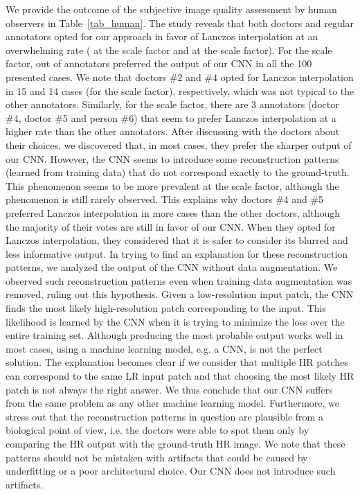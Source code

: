 \documentclass{ieeeaccess}
\begin{document}
We provide the outcome of the subjective image quality assessment by human observers in Table~\ref{tab_human}. The study reveals that both doctors and regular annotators opted for our approach in favor of Lanczos interpolation at an overwhelming rate ( at the  scale factor and  at the  scale factor). For the  scale factor,  out of  annotators preferred the output of our CNN in all the 100 presented cases. We note that doctors \#2 and \#4 opted for Lanczos interpolation in 15 and 14 cases (for the  scale factor), respectively, which was not typical to the other annotators. Similarly, for the  scale factor, there are 3 annotators (doctor \#4, doctor \#5 and person \#6) that seem to prefer Lanczos interpolation at a higher rate than the other annotators. After discussing with the doctors about their choices, we discovered that, in most cases, they prefer the sharper output of our CNN. However, the CNN seems to introduce some reconstruction patterns (learned from training data) that do not correspond exactly to the ground-truth. This phenomenon seems to be more prevalent at the  scale factor, although the phenomenon is still rarely observed. This explains why doctors \#4 and \#5 preferred Lanczos interpolation in more cases than the other doctors, although the majority of their votes are still in favor of our CNN. When they opted for Lanczos interpolation, they considered that it is safer to consider its blurred and less informative output. In trying to find an explanation for these reconstruction patterns, we analyzed the output of the CNN without data augmentation. We observed such reconstruction patterns even when training data augmentation was removed, ruling out this hypothesis. Given a low-resolution input patch, the CNN finds the most likely high-resolution patch corresponding to the input. This likelihood is learned by the CNN when it is trying to minimize the loss over the entire training set. Although producing the most probable output works well in most cases, using a machine learning model, e.g. a CNN, is not the perfect solution. The explanation becomes clear if we consider that multiple HR patches can correspond to the same LR input patch and that choosing the most likely HR patch is not always the right answer. We thus conclude that our CNN suffers from the same problem as any other machine learning model. Furthermore, we stress out that the reconstruction patterns in question are plausible from a biological point of view, i.e. the doctors were able to spot them only by comparing the HR output with the ground-truth HR image. We note that these patterns should not be mistaken with artifacts that could be caused by underfitting or a poor architectural choice. Our CNN does not introduce such artifacts.
\end{document}
